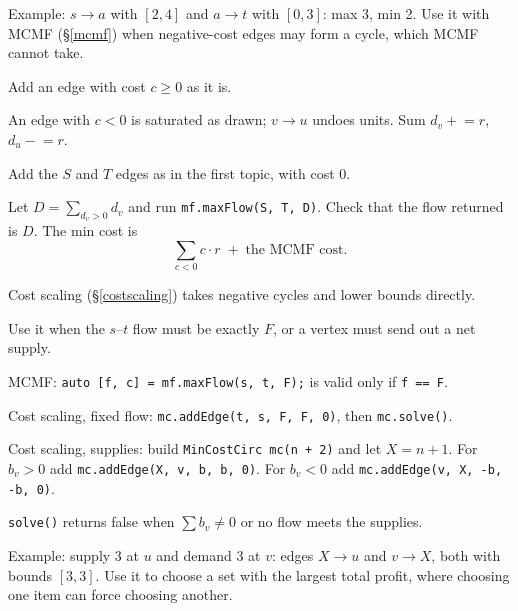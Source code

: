 {\begin{facts}
\end{facts}
Example: $s \to a$ with $[2, 4]$ and $a \to t$ with $[0, 3]$: max 3, min 2.
Use it with MCMF (\S\ref{mcmf}) when negative-cost edges may form a cycle, which MCMF cannot take.
\begin{facts}
	\item Add an edge with cost $c \ge 0$ as it is.
	\item An edge with $c < 0$ is saturated as drawn; $v \to u$ undoes units. Sum $d_v \mathrel{+}= r$, $d_u \mathrel{-}= r$.
	\item Add the $S$ and $T$ edges as in the first topic, with cost 0.
	\item Let $D = \sum_{d_v > 0} d_v$ and run \texttt{mf.maxFlow(S, T, D)}. Check that the flow returned is $D$. The min cost is
	\[ \textstyle\sum_{c < 0} c \cdot r \; + \; \text{the MCMF cost}. \]
	\item Cost scaling (\S\ref{costscaling}) takes negative cycles and lower bounds directly.
\end{facts}
Use it when the $s$--$t$ flow must be exactly $F$, or a vertex must send out a net supply.
\begin{facts}
	\item MCMF: \texttt{auto [f, c] = mf.maxFlow(s, t, F);} is valid only if \texttt{f == F}.
	\item Cost scaling, fixed flow: \texttt{mc.addEdge(t, s, F, F, 0)}, then \texttt{mc.solve()}.
	\item Cost scaling, supplies: build \texttt{MinCostCirc mc(n + 2)} and let $X = n + 1$. For $b_v > 0$ add \texttt{mc.addEdge(X, v, b, b, 0)}. For $b_v < 0$ add \texttt{mc.addEdge(v, X, -b, -b, 0)}.
	\item \texttt{solve()} returns false when $\sum b_v \ne 0$ or no flow meets the supplies.
\end{facts}
Example: supply 3 at $u$ and demand 3 at $v$: edges $X \to u$ and $v \to X$, both with bounds $[3, 3]$.
Use it to choose a set with the largest total profit, where choosing one item can force choosing another.
}
